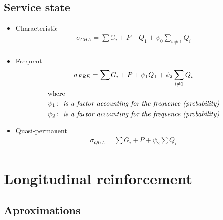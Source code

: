 \documentclass[landscape]{article}
\begin{document}
\begin{multicols*}{2}
\subsection{Service state} %
\label{sub:service_state}
\begin{itemize}[label=]
  \item Characteristic
  \begin{gather}\label{eq:2.1}
      \sigma_{CHA} = \sum G_i + P + Q_1+ \psi_0\sum_{i\neq 1} Q_i  \\
  \end{gather}
  \item Frequent
    \begin{gather}\label{eq:2.1}
      \sigma_{FRE} = \sum G_i + P + \psi_1Q_1+ \psi_2\sum_{i\neq 1} Q_i  \\
      \shortintertext{where}
      \begin{aligned}
        &\psi_1 : \emph{ is a factor accounting for the frequence (probability)}\\
        &\psi_2 : \emph{ is a factor accounting for the frequence (probability)}
      \end{aligned}\notag
  \end{gather}
  \item Quasi-permanent
  \begin{gather}\label{eq:2.1}
      \sigma_{QUA} = \sum G_i + P + \psi_2\sum Q_i  \\
  \end{gather}
\end{itemize}


\section{Longitudinal reinforcement} %
\label{sec:longitudinal_reinforcement}
\subsection{Aproximations} %
\label{sub:aproximations}

\end{multicols*}
\end{document}
